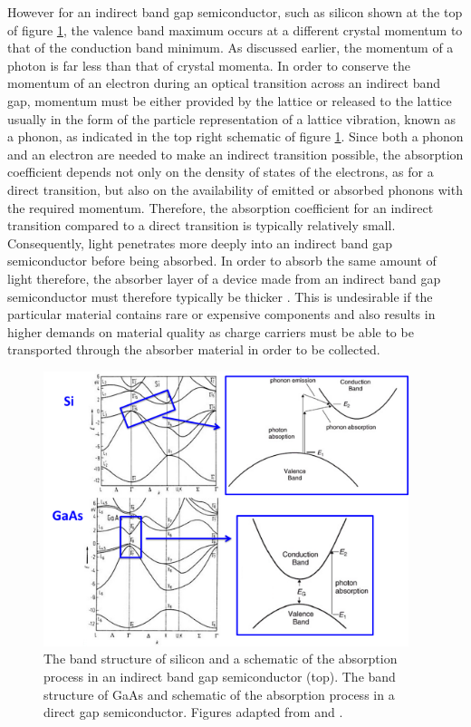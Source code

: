 However for an indirect band gap semiconductor, such as silicon shown at the top of figure \ref{Si_and_GaAs}, the valence band maximum occurs at a different crystal momentum to that of the conduction band minimum. As discussed earlier, the momentum of a photon is far less than that of crystal momenta. In order to conserve the momentum of an electron during an optical transition across an indirect band gap, momentum must be either provided by the lattice or released to the lattice usually in the form of the particle representation of a lattice vibration, known as a phonon, as indicated in the top right schematic of figure \ref{Si_and_GaAs}. Since both a phonon and an electron are needed to make an indirect transition possible, the absorption coefficient depends not only on the density of states of the electrons, as for a direct transition, but also on the availability of emitted or absorbed phonons with the required momentum. Therefore, the absorption coefficient for an indirect transition compared to a direct transition is typically relatively small. Consequently, light penetrates more deeply into an indirect band gap semiconductor before being absorbed. In order to absorb the same amount of light therefore, the absorber layer of a device made from an indirect band gap semiconductor must therefore typically be thicker \cite{PV_bands_book}. This is undesirable if the particular material contains rare or expensive components and also results in higher demands on material quality as charge carriers must be able to be transported through the absorber material in order to be collected.

\begin{figure}[h!]
  \centering
    \includegraphics[width=0.95\textwidth]{figures/Si_and_GaAs.png}
    \caption{The band structure of silicon and a schematic of the absorption process in an indirect band gap semiconductor (top). The band structure of GaAs and schematic of the absorption process in a direct gap semiconductor. Figures adapted from  and .}
  \label{Si_and_GaAs}
\end{figure}

